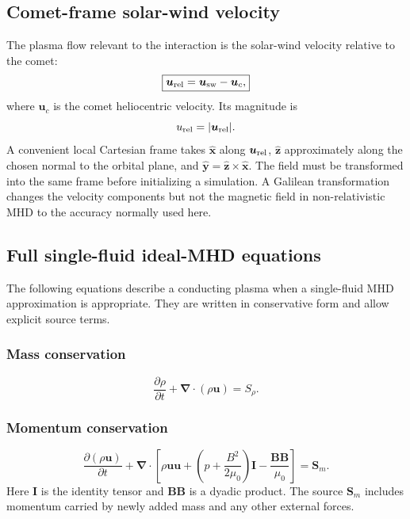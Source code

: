 \documentclass[11pt,a4paper]{article}
\newcommand{\Div}{\boldsymbol{\nabla}\!\cdot}
\newcommand{\uvec}{\boldsymbol{u}}
\newcommand{\Bvec}{\boldsymbol{B}}
\newcommand{\Svec}{\boldsymbol{S}}
\newcommand{\rhov}{\rho}
\begin{document}
\subsection{Comet-frame solar-wind velocity}
The plasma flow relevant to the interaction is the solar-wind velocity relative to the comet:
\begin{equation}
\boxed{\uvec_{\rm rel}=\uvec_{\rm sw}-\uvec_c,}
\label{eq:relative-velocity}
\end{equation}
where $\uvec_c$ is the comet heliocentric velocity. Its magnitude is
\begin{equation}
u_{\rm rel}=|\uvec_{\rm rel}|.
\end{equation}
A convenient local Cartesian frame takes $\hat{\boldsymbol x}$ along $\uvec_{\rm rel}$, $\hat{\boldsymbol z}$ approximately along the chosen normal to the orbital plane, and $\hat{\boldsymbol y}=\hat{\boldsymbol z}\times\hat{\boldsymbol x}$. The field must be transformed into the same frame before initializing a simulation. A Galilean transformation changes the velocity components but not the magnetic field in non-relativistic MHD to the accuracy normally used here.

\subsection{Full single-fluid ideal-MHD equations}
The following equations describe a conducting plasma when a single-fluid MHD approximation is appropriate. They are written in conservative form and allow explicit source terms.
\subsubsection{Mass conservation}
\begin{equation}
\boxed{\frac{\partial\rhov}{\partial t}+\Div(\rhov\uvec)=S_\rho.}
\label{eq:mhd-mass}
\end{equation}
\subsubsection{Momentum conservation}
\begin{equation}
\boxed{\frac{\partial(\rhov\uvec)}{\partial t}
+\Div\left[\rhov\uvec\uvec+\left(p+\frac{B^2}{2\mu_0}\right)\mathbf I
-\frac{\Bvec\Bvec}{\mu_0}\right]
=\Svec_m.}
\label{eq:mhd-momentum}
\end{equation}
Here $\mathbf I$ is the identity tensor and $\Bvec\Bvec$ is a dyadic product. The source $\Svec_m$ includes momentum carried by newly added mass and any other external forces.
\end{document}
